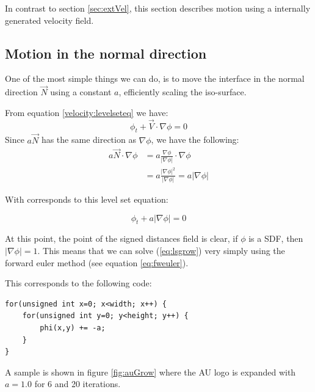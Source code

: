 

In contrast to section \vref{sec:extVel}, this section describes
motion using a internally generated velocity field.


\subsection{Motion in the normal direction}

One of the most simple things we can do, is to move the interface in
the normal direction $\vec{N}$ using a constant $a$, efficiently
scaling the iso-surface.

From equation \vref{velocity:levelseteq} we have:
\begin{equation}
  \phi_t + \vec{V}\cdot \nabla \phi = 0
\end{equation}
Since $a\vec{N}$ has the same direction as $\nabla{\phi}$, we have the following:
\begin{align*}
  a\vec{N}\cdot\nabla\phi &=
  a\frac{\nabla\phi}{|\nabla\phi|}\cdot\nabla\phi \\
  &= a\frac{|\nabla\phi|^2}{|\nabla\phi|} 
  = a|\nabla\phi|
\end{align*}

With corresponds to this level set equation:

\begin{equation}
  \phi_t + a |\nabla \phi| = 0
\end{equation}\label{eq:lsgrow}

At this point, the point of the signed distances field is clear, if
$\phi$ is a SDF, then $|\nabla\phi| = 1$. This means that we can solve
(\ref{eq:lsgrow}) very simply using the forward euler method (see
equation \ref{eq:fweuler}).

This corresponds to the following code:

\begin{lstlisting}
for(unsigned int x=0; x<width; x++) {
    for(unsigned int y=0; y<height; y++) {
        phi(x,y) += -a;
    }
}
\end{lstlisting}

A sample is shown in figure \ref{fig:auGrow} where the AU logo is
expanded with $a=1.0$ for 6 and 20 iterations.


